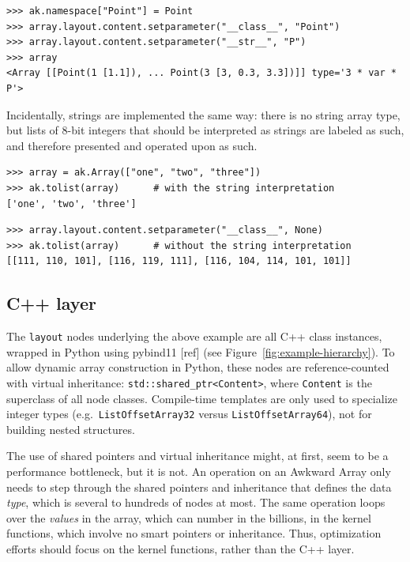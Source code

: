\documentclass{webofc}
\begin{document}
\begin{verbatim}
>>> ak.namespace["Point"] = Point
>>> array.layout.content.setparameter("__class__", "Point")
>>> array.layout.content.setparameter("__str__", "P")
>>> array
<Array [[Point(1 [1.1]), ... Point(3 [3, 0.3, 3.3])]] type='3 * var * P'>
\end{verbatim}

\noindent Incidentally, strings are implemented the same way: there is no string array type, but lists of 8-bit integers that should be interpreted as strings are labeled as such, and therefore presented and operated upon as such.

\begin{verbatim}
>>> array = ak.Array(["one", "two", "three"])
>>> ak.tolist(array)      # with the string interpretation
['one', 'two', 'three']
\end{verbatim}

\begin{verbatim}
>>> array.layout.content.setparameter("__class__", None)
>>> ak.tolist(array)      # without the string interpretation
[[111, 110, 101], [116, 119, 111], [116, 104, 114, 101, 101]]
\end{verbatim}

\subsection{C++ layer}

The \texttt{layout} nodes underlying the above example are all C++ class instances, wrapped in Python using pybind11 [ref] (see Figure~\ref{fig:example-hierarchy}). To allow dynamic array construction in Python, these nodes are reference-counted with virtual inheritance: \texttt{std::shared_ptr<Content>}, where \texttt{Content} is the superclass of all node classes. Compile-time templates are only used to specialize integer types (e.g.\ \texttt{ListOffsetArray32} versus \texttt{ListOffsetArray64}), not for building nested structures.

The use of shared pointers and virtual inheritance might, at first, seem to be a performance bottleneck, but it is not. An operation on an Awkward Array only needs to step through the shared pointers and inheritance that defines the data {\it type}, which is several to hundreds of nodes at most. The same operation loops over the {\it values} in the array, which can number in the billions, in the kernel functions, which involve no smart pointers or inheritance. Thus, optimization efforts should focus on the kernel functions, rather than the C++ layer.
\end{document}
